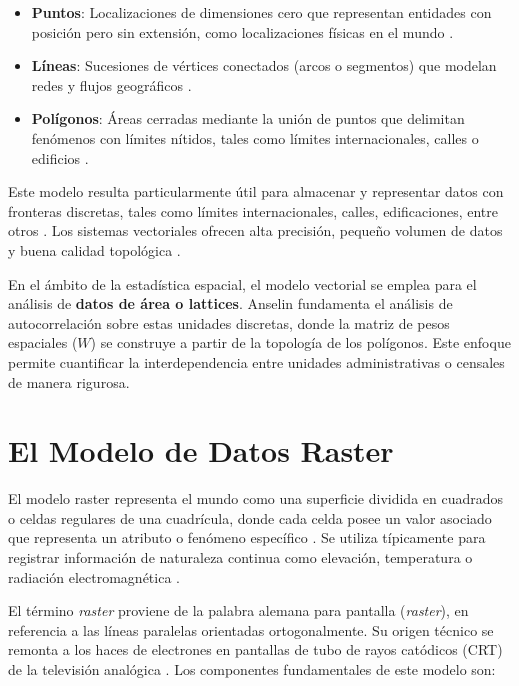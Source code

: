 \documentclass[11pt,a4paper]{article}
\begin{document}
\begin{itemize}
    \item \textbf{Puntos}: Localizaciones de dimensiones cero que representan entidades con posición pero sin extensión, como localizaciones físicas en el mundo \cite{das2022application}.
    \item \textbf{Líneas}: Sucesiones de vértices conectados (arcos o segmentos) que modelan redes y flujos geográficos \cite{bivand2013applied, maesen2024introduction}.
    \item \textbf{Polígonos}: Áreas cerradas mediante la unión de puntos que delimitan fenómenos con límites nítidos, tales como límites internacionales, calles o edificios \cite{das2022application}.
\end{itemize}

Este modelo resulta particularmente útil para almacenar y representar datos con fronteras discretas, tales como límites internacionales, calles, edificaciones, entre otros \cite{das2022application}. Los sistemas vectoriales ofrecen alta precisión, pequeño volumen de datos y buena calidad topológica \cite{yao2018big}.

En el ámbito de la estadística espacial, el modelo vectorial se emplea para el análisis de \textbf{datos de área o lattices}. Anselin \cite{anselin1988spatial} fundamenta el análisis de autocorrelación sobre estas unidades discretas, donde la matriz de pesos espaciales ($W$) se construye a partir de la topología de los polígonos. Este enfoque permite cuantificar la interdependencia entre unidades administrativas o censales de manera rigurosa.

\section{El Modelo de Datos Raster}

El modelo raster representa el mundo como una superficie dividida en cuadrados o celdas regulares de una cuadrícula, donde cada celda posee un valor asociado que representa un atributo o fenómeno específico \cite{giofandi2023comparison}. Se utiliza típicamente para registrar información de naturaleza continua como elevación, temperatura o radiación electromagnética \cite{pingel2018raster}.

El término \textit{raster} proviene de la palabra alemana para pantalla (\textit{raster}), en referencia a las líneas paralelas orientadas ortogonalmente. Su origen técnico se remonta a los haces de electrones en pantallas de tubo de rayos catódicos (CRT) de la televisión analógica \cite{pingel2018raster}. Los componentes fundamentales de este modelo son:
\end{document}
